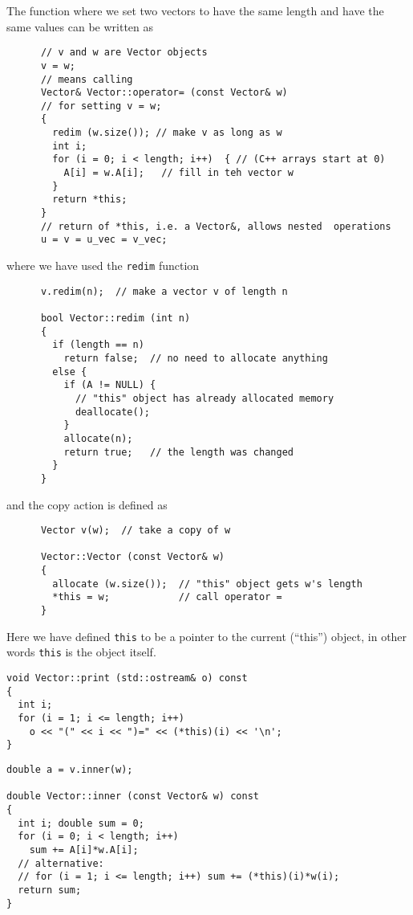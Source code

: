 The function where we set two vectors to have the same 
length and have the same values can be written as  
\begin{lstlisting}
      // v and w are Vector objects
      v = w;
      // means calling
      Vector& Vector::operator= (const Vector& w)
      // for setting v = w;
      {
        redim (w.size()); // make v as long as w
        int i;
        for (i = 0; i < length; i++)  { // (C++ arrays start at 0)
          A[i] = w.A[i];   // fill in teh vector w
        }
        return *this;
      }
      // return of *this, i.e. a Vector&, allows nested  operations
      u = v = u_vec = v_vec;
\end{lstlisting}
where we have used the \verb?redim? function 
\begin{lstlisting}
      v.redim(n);  // make a vector v of length n

      bool Vector::redim (int n)
      {
        if (length == n)
          return false;  // no need to allocate anything
        else {
          if (A != NULL) {
            // "this" object has already allocated memory
            deallocate();
          }
          allocate(n);
          return true;   // the length was changed
        }
      }
\end{lstlisting}
and the copy action is defined as 
\begin{lstlisting}
      Vector v(w);  // take a copy of w

      Vector::Vector (const Vector& w)
      {
        allocate (w.size());  // "this" object gets w's length
        *this = w;            // call operator =
      }

\end{lstlisting}
Here we have defined 
\verb?this? to be  a pointer to the current (``this'') object, in other words
\verb?this? is the object itself. 
\begin{lstlisting}
void Vector::print (std::ostream& o) const
{
  int i;
  for (i = 1; i <= length; i++)
    o << "(" << i << ")=" << (*this)(i) << '\n';
}
\end{lstlisting}

\begin{lstlisting}
double a = v.inner(w);

double Vector::inner (const Vector& w) const
{
  int i; double sum = 0;
  for (i = 0; i < length; i++)  
    sum += A[i]*w.A[i];
  // alternative: 
  // for (i = 1; i <= length; i++) sum += (*this)(i)*w(i);
  return sum;
}
\end{lstlisting}

